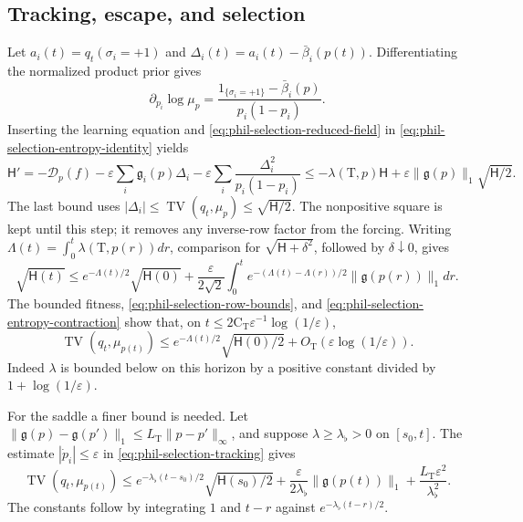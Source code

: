 \subsection*{Tracking, escape, and selection}

Let \(a_i(t)=q_t(\sigma_i=+1)\) and
\(\Delta_i(t)=a_i(t)-\bar\beta_i(p(t))\).
Differentiating the normalized product prior gives
\[
 \partial_{p_i}\log\mu_p
 =\frac{1_{\{\sigma_i=+1\}}-\bar\beta_i(p)}{p_i(1-p_i)}.
\]
Inserting the learning equation and
\cref{eq:phil-selection-reduced-field} in
\cref{eq:phil-selection-entropy-identity} yields
\begin{equation}
 \mathsf H'
 =-\mathscr D_p(f)-\varepsilon\sum_i\mathfrak g_i(p)\Delta_i
                  -\varepsilon\sum_i\frac{\Delta_i^2}{p_i(1-p_i)}
 \le-\lambda(\mathrm T,p)\mathsf H
      +\varepsilon\|\mathfrak g(p)\|_1\sqrt{\mathsf H/2}.
\label{eq:phil-selection-learning-entropy}
\end{equation}
The last bound uses \(|\Delta_i|\le\operatorname{TV}(q_t,\mu_p)
\le\sqrt{\mathsf H/2}\). The nonpositive square is kept until this step;
it removes any inverse-row factor from the forcing.
Writing \(\Lambda(t)=\int_0^t\lambda(\mathrm T,p(r))dr\), comparison
for \(\sqrt{\mathsf H+\delta^2}\), followed by \(\delta\downarrow0\), gives
\begin{equation}
 \sqrt{\mathsf H(t)}
 \le e^{-\Lambda(t)/2}\sqrt{\mathsf H(0)}
    +\frac{\varepsilon}{2\sqrt2}
       \int_0^te^{-(\Lambda(t)-\Lambda(r))/2}
                         \|\mathfrak g(p(r))\|_1dr.
\label{eq:phil-selection-tracking}
\end{equation}
The bounded fitness, \cref{eq:phil-selection-row-bounds}, and
\cref{eq:phil-selection-entropy-contraction} show that, on
\(t\le2\mathrm C_{\mathrm T}\varepsilon^{-1}\log(1/\varepsilon)\),
\begin{equation}
 \operatorname{TV}(q_t,\mu_{p(t)})
 \le e^{-\Lambda(t)/2}\sqrt{\mathsf H(0)/2}
       +O_{\mathrm T}(\varepsilon\log(1/\varepsilon)).
\label{eq:phil-selection-global-tracking}
\end{equation}
Indeed \(\lambda\) is bounded below on this horizon by a positive
constant divided by \(1+\log(1/\varepsilon)\).

For the saddle a finer bound is needed. Let
\(\|\mathfrak g(p)-\mathfrak g(p')\|_1
 \le L_{\mathrm T}\|p-p'\|_\infty\), and suppose
\(\lambda\ge\lambda_\flat>0\) on \([s_0,t]\).
The estimate \(|\dot p_i|\le\varepsilon\) in
\cref{eq:phil-selection-tracking} gives
\begin{equation}
 \operatorname{TV}(q_t,\mu_{p(t)})
 \le e^{-\lambda_\flat(t-s_0)/2}\sqrt{\mathsf H(s_0)/2}
   +\frac{\varepsilon}{2\lambda_\flat}\|\mathfrak g(p(t))\|_1
   +\frac{L_{\mathrm T}\varepsilon^2}{\lambda_\flat^2}.
\label{eq:phil-selection-refined-tracking}
\end{equation}
The constants follow by integrating \(1\) and \(t-r\) against
\(e^{-\lambda_\flat(t-r)/2}\).

